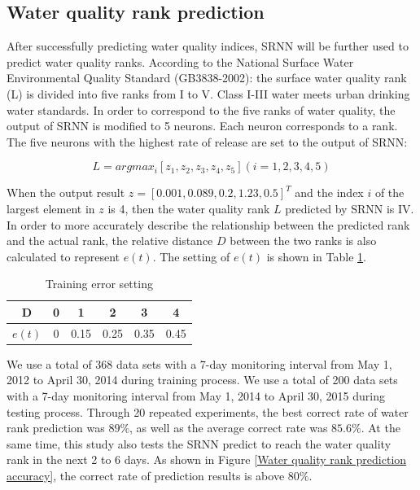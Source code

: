 \documentclass[runningheads]{llncs}
\begin{document}
\subsection{Water quality rank prediction}
After successfully predicting water quality indices, 
SRNN will be further used to predict water quality ranks. 
According to the National Surface Water Environmental Quality Standard (GB3838-2002): 
the surface water quality rank (L) is divided into 
five ranks from I to V. Class I-III water meets urban drinking water standards. 
In order to correspond to the five ranks of water quality, the output of 
SRNN is modified to 5 neurons. Each neuron corresponds to a rank. 
The five neurons with the highest rate of release are set to the output of SRNN:

\begin{equation}
L=argmax_i[z_1,z_2,z_3,z_4,z_5 ](i=1,2,3,4,5)
\end{equation}

When the output result $z = [0.001, 0.089, 0.2, 1.23, 0.5]^T$ and the index $i$ of 
the largest element in $z$ is 4, then the water quality rank $L$ predicted by SRNN is IV. 
In order to more accurately describe the relationship between the predicted 
rank and the actual rank, the relative distance $D$ between the two ranks 
is also calculated to represent $e(t)$. The setting of $e(t)$ is shown in Table \ref{Training error setting}.
\begin{table}[htbp] 
\centering
\caption{Training error setting}
\label{Training error setting}
\begin{tabular}{cccccc} 
\toprule 
D&0&1&2&3&4\\ 
\midrule 
$e(t)$&0&0.15&0.25&0.35&0.45\\ 
\bottomrule 
\end{tabular} 
\end{table}

We use a total of 368 data sets with a 7-day monitoring interval from May 1,
2012 to April 30, 2014 during training process. We use a total of 200 data sets with a 
7-day monitoring interval from May 1, 2014 to April 30, 2015 during testing process. 
Through 20 repeated experiments, the best correct rate of water rank prediction was $89\%$,
as well as the average correct rate was $85.6\%$. At the same time, 
this study also tests the SRNN predict to reach the water quality
rank in the next 2 to 6 days.  As shown in Figure \ref{Water quality rank prediction accuracy},
the correct rate of prediction results is above $80\%$.
\end{document}
